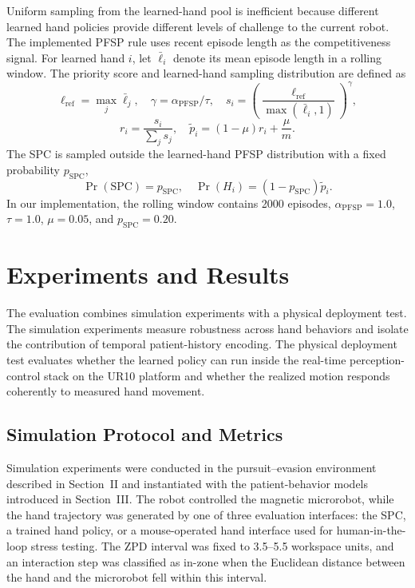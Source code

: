 \documentclass[lettersize,journal]{IEEEtran}
\begin{document}
Uniform sampling from the learned-hand pool is inefficient because different learned hand policies provide different levels of challenge to the current robot. The implemented PFSP rule uses recent episode length as the competitiveness signal. For learned hand $i$, let $\bar{\ell}_i$ denote its mean episode length in a rolling window. The priority score and learned-hand sampling distribution are defined as
\begin{equation}
 \ell_{\mathrm{ref}}=\max_j \bar{\ell}_j,\quad
 \gamma=\alpha_{\mathrm{PFSP}}/\tau,\quad
 s_i=\left(\frac{\ell_{\mathrm{ref}}}{\max(\bar{\ell}_i,1)}\right)^\gamma,
\end{equation}
\begin{equation}
 r_i=\frac{s_i}{\sum_j s_j},\quad
 \tilde{p}_i=(1-\mu)r_i+\frac{\mu}{m}.
\end{equation}
The SPC is sampled outside the learned-hand PFSP distribution with a fixed probability $p_{\mathrm{SPC}}$,
\begin{equation}
 \Pr(\mathrm{SPC})=p_{\mathrm{SPC}},\quad \Pr(H_i)=(1-p_{\mathrm{SPC}})\tilde{p}_i.
\end{equation}
In our implementation, the rolling window contains 2000 episodes, $\alpha_{\mathrm{PFSP}}=1.0$, $\tau=1.0$, $\mu=0.05$, and $p_{\mathrm{SPC}}=0.20$.

\section{Experiments and Results}
The evaluation combines simulation experiments with a physical deployment test. The simulation experiments measure robustness across hand behaviors and isolate the contribution of temporal patient-history encoding. The physical deployment test evaluates whether the learned policy can run inside the real-time perception-control stack on the UR10 platform and whether the realized motion responds coherently to measured hand movement.

\subsection{Simulation Protocol and Metrics}
Simulation experiments were conducted in the pursuit--evasion environment described in Section~II and instantiated with the patient-behavior models introduced in Section~III. The robot controlled the magnetic microrobot, while the hand trajectory was generated by one of three evaluation interfaces: the SPC, a trained hand policy, or a mouse-operated hand interface used for human-in-the-loop stress testing. The ZPD interval was fixed to 3.5--5.5 workspace units, and an interaction step was classified as in-zone when the Euclidean distance between the hand and the microrobot fell within this interval.
\end{document}
